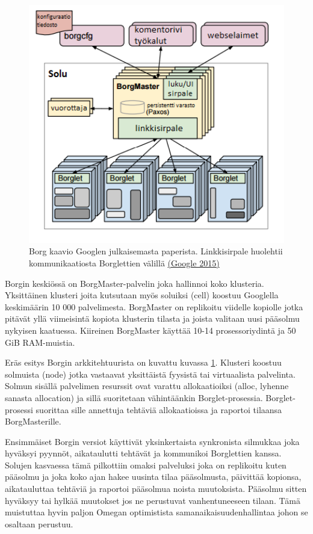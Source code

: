 \documentclass[finnish]{tktltiki2}
\theoremstyle{definition}
\theoremstyle{remark}
\begin{document}
\begin{figure}[h]
    \centering
    \includegraphics[width=1\textwidth]{images/borg.png}
    \caption{Borg kaavio Googlen julkaisemasta paperista. Linkkisirpale huolehtii kommunikaatiosta Borglettien välillä \href{https://ai.google/research/pubs/pub43438}{(Google 2015)}}
    \label{fig:borg}
\end{figure}

Borgin keskiössä on BorgMaster-palvelin joka hallinnoi koko klusteria. Yksittäinen klusteri joita kutsutaan myös soluiksi (cell) koostuu Googlella keskimäärin 10 000 palvelimesta. BorgMaster on replikoitu viidelle kopiolle jotka pitävät yllä viimeisintä kopiota klusterin tilasta ja joista valitaan uusi pääsolmu nykyisen kaatuessa. Kiireinen BorgMaster käyttää 10-14 prosessoriydintä ja 50 GiB RAM-muistia.

Eräs esitys Borgin arkkitehtuurista on kuvattu kuvassa \ref{fig:borg}. Klusteri koostuu solmuista (node) jotka vastaavat yksittäistä fyysistä tai virtuaalista palvelinta. Solmun sisällä palvelimen resurssit ovat varattu allokaatioiksi (alloc, lyhenne sanasta allocation) ja sillä suoritetaan vähintäänkin Borglet-prosessia. Borglet-prosessi suorittaa sille annettuja tehtäviä allokaatioissa ja raportoi tilaansa BorgMasterille.

Ensimmäiset Borgin versiot käyttivät yksinkertaista synkronista silmukkaa joka hyväksyi pyynnöt, aikataulutti tehtävät ja kommunikoi Borglettien kanssa. Solujen kasvaessa tämä pilkottiin omaksi palveluksi joka on replikoitu kuten pääsolmu ja joka koko ajan hakee uusinta tilaa pääsolmusta, päivittää kopionsa, aikatauluttaa tehtäviä ja raportoi pääsolmua noista muutoksista. Pääsolmu sitten hyväksyy tai hylkää muutokset jos ne perustuvat vanhentuneeseen tilaan. Tämä muistuttaa hyvin paljon Omegan optimistista samanaikaisuudenhallintaa johon se osaltaan perustuu.
\end{document}
